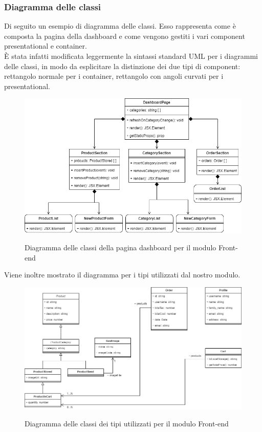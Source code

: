 \subsubsection{Diagramma delle classi}
Di seguito un esempio di diagramma delle classi. Esso rappresenta come è composta la pagina della dashboard e come vengono gestiti i vari component presentational e container.\\ È stata infatti modificata leggermente la sintassi standard UML per i diagrammi delle classi, in modo da esplicitare la distinzione dei due tipi di component: rettangolo normale per i container, rettangolo con angoli curvati per i presentational.

\vspace{1cm}

\begin{figure}[H]
\centering
\includegraphics[scale=0.55]{res/Architettura/Frontend/img/class_frontend_dashboard}\\
\caption{Diagramma delle classi della pagina dashboard per il modulo Front-end}
\end{figure}

Viene inoltre mostrato il diagramma per i tipi utilizzati dal nostro modulo.

\begin{figure}[H]
\centering
\includegraphics[scale=0.45]{res/Architettura/Frontend/img/class_frontend_types}\\
\caption{Diagramma delle classi dei tipi utilizzati per il modulo Front-end}
\end{figure}